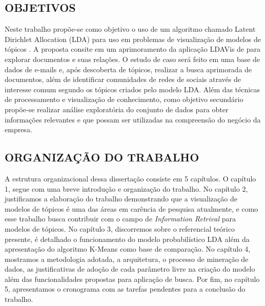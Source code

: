 \documentclass[12pt,a4paper]{article}
\begin{document}
\subsection{OBJETIVOS}

Neste trabalho propõe-se como objetivo o uso de um algoritmo chamado Latent Dirichlet Allocation (LDA) para uso em problemas de visualização de modelos de tópicos \cite{blei2003latent}. A proposta consite em um aprimoramento da aplicação LDAVis de  para explorar documentos e suas relações. O estudo de caso será feito em uma base de dados de e-mails e, após descoberta de tópicos, realizar a busca aprimorada de documentos, além de identificar  comunidades de redes de sociais através de interesse comum segundo os tópicos criados pelo modelo LDA. Além das técnicas de processamento e visualização de conhecimento, como objetivo secundário propõe-se realizar análise exploratória do conjunto de dados para obter informações relevantes e que possam ser utilizadas na compreensão do negócio da empresa.


\subsection{ORGANIZAÇÃO DO TRABALHO}

 A estrutura organizacional dessa dissertação consiste em 5 capítulos. O capítulo 1, segue com uma breve introdução e organização do trabalho. 
  No capítulo 2, justificamos a elaboração do trabalho demonstrando que a visualização de modelos de tópicos é uma das áreas em carência de pesquisa atualmente, 
  e como esse trabalho busca contribuir com o campo de \textit{Information Retrival} para modelos de tópicos. No capítulo 3, discorremos sobre o referencial teórico presente, 
  é detalhado o funcionamento do modelo probabilístico LDA além da apresentação do algoritmo K-Means como base de comparação. No capítulo 4, mostramos a metodologia adotada, 
  a arquitetura, o processo de mineração de dados, as justificativas de adoção de cada parâmetro livre na criação do modelo além das funcionalidades propostas para
  aplicação de busca. Por fim, no capítulo 5, apresentamos o cronograma com as tarefas pendentes para a conclusão do trabalho.




\end{document}

